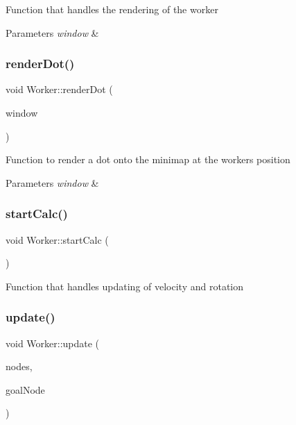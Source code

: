 Function that handles the rendering of the worker 


\begin{DoxyParams}{Parameters}
{\em window} & \\
\hline
\end{DoxyParams}
\mbox{\label{class_worker_a7e1feb9eceef5b8f2cf215e9e1f992f9}} 
\subsubsection{\texorpdfstring{renderDot()}{renderDot()}}
{\footnotesize\ttfamily void Worker\+::render\+Dot (\begin{DoxyParamCaption}\item[{sf\+::\+Render\+Window \&}]{window }\end{DoxyParamCaption})}



Function to render a dot onto the minimap at the workers position 


\begin{DoxyParams}{Parameters}
{\em window} & \\
\hline
\end{DoxyParams}
\mbox{\label{class_worker_a9bb217423adfa630f0fe3a71e2dc5468}} 
\subsubsection{\texorpdfstring{startCalc()}{startCalc()}}
{\footnotesize\ttfamily void Worker\+::start\+Calc (\begin{DoxyParamCaption}{ }\end{DoxyParamCaption})}



Function that handles updating of velocity and rotation 

\mbox{\label{class_worker_a6d522360a022f0a94db7e01547c4bcdc}} 
\subsubsection{\texorpdfstring{update()}{update()}}
{\footnotesize\ttfamily void Worker\+::update (\begin{DoxyParamCaption}\item[{std\+::vector$<$ \mbox{\hyperlink{class_node}{Node}} $\ast$ $>$ \&}]{nodes,  }\item[{int}]{goal\+Node }\end{DoxyParamCaption})}



